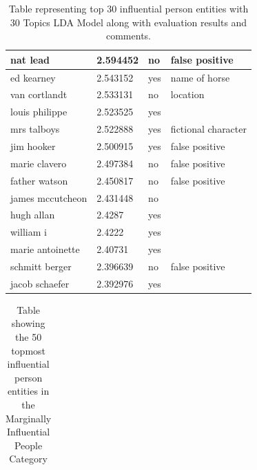 \documentclass[letterpaper,11pt]{report}
\begin{document}
\begin{table}[h]
\begin{tabular}{|l|l|p{3cm}|p{3cm}|}
nat lead         & 2.594452 & no                 & false positive                       \\ \hline
ed kearney       & 2.543152 & yes                & name of horse                        \\ \hline
van cortlandt    & 2.533131 & no                 & location                             \\ \hline
louis philippe   & 2.523525 & yes                &                                      \\ \hline
mrs talboys      & 2.522888 & yes                & fictional character                  \\ \hline
jim hooker       & 2.500915 & yes                & false positive                       \\ \hline
marie clavero    & 2.497384 & no                 & false positive                       \\ \hline
father watson    & 2.450817 & no                 & false positive                       \\ \hline
james mccutcheon & 2.431448 & no                 &                       \\ \hline
hugh allan       & 2.4287   & yes                &                                      \\ \hline
william i        & 2.4222   & yes                &                                      \\ \hline
marie antoinette & 2.40731  & yes                &                                      \\ \hline
schmitt berger   & 2.396639 & no                 & false positive                       \\ \hline
jacob schaefer   & 2.392976 & yes                &                                      \\ \hline
             
\end{tabular}
\caption{Table representing top 30 influential person entities with 30 Topics LDA Model along with evaluation results and comments.}
\label{table:app1}
\end{table}


\begin{table}[h]
\centering
\begin{tabular}{|l|l|}
\hline

\end{tabular}
\caption{Table showing the 50 topmost influential person entities in the Marginally Influential People Category}
\label{table:app3}
\end{table}
\end{document}
